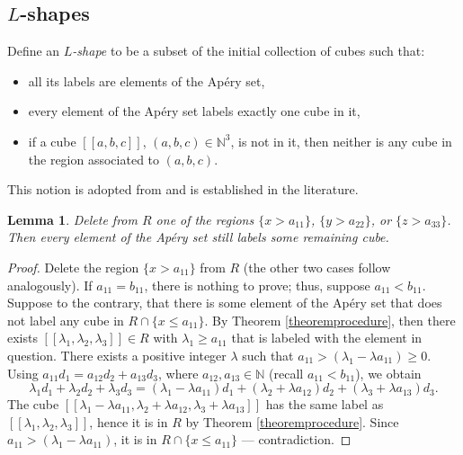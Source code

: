 \documentclass[12pt]{article}
\newtheorem{lemma}[thm]{Lemma}
\theoremstyle{remark}
\begin{document}
\subsection{$L$-shapes}\label{subsection_Lshapes}

Define an \emph{$L$-shape} to be a subset of the initial collection of cubes such that:
\begin{itemize}
    \item all its labels are elements of the Ap{\'e}ry set,
    \item every element of the Ap{\'e}ry set labels exactly one cube in it,
    \item if a cube $[[a,b,c]]$, $(a,b,c) \in \mathbb{N}^3$, is not in it, then neither is any cube in the region associated to $(a,b,c)$.
\end{itemize}
This notion is adopted from \cite{AGUILOGOST2015} and is established in the literature.

\begin{lemma}\label{lemma_procedure_2}
     Delete from $R$ one of the regions $\{x > a_{11}\}$, $\{y > a_{22}\}$, or $\{z > a_{33}\}$. Then every element of the Ap{\'e}ry set still labels some remaining cube.
\end{lemma}

\begin{proof}
Delete the region $\{x > a_{11}\}$ from $R$ (the other two cases follow analogously). 
If $a_{11} = b_{11}$, there is nothing to prove; thus, suppose $a_{11} < b_{11}$. Suppose to the contrary, that there is some element of the Ap{\'e}ry set that does not label any cube in $R \cap \{x \leq a_{11}\}$. By Theorem \ref{theoremprocedure}, then there exists $[[\lambda_1, \lambda_2,\lambda_3]] \in R$ with $\lambda_1 \geq a_{11}$ that is labeled with the element in question. There exists a positive integer $\lambda$ such that $a_{11} > (\lambda_1 - \lambda a_{11}) \geq 0$. Using $a_{11}d_1 = a_{12}d_2 + a_{13}d_3$, where $a_{12},a_{13} \in \mathbb{N}$ (recall $a_{11} < b_{11}$), we obtain
    \begin{equation}
        \lambda_1d_1 + \lambda_2d_2 + \lambda_3d_3 = (\lambda_1 - \lambda a_{11})d_1 + (\lambda_2+\lambda a_{12})d_2 + (\lambda_3+\lambda a_{13})d_3.
    \end{equation}
The cube $[[\lambda_1 - \lambda a_{11},\lambda_2+\lambda a_{12},\lambda_3+\lambda a_{13} ]]$ has the same label as $[[\lambda_1, \lambda_2,\lambda_3]]$, hence it is in $R$ by Theorem \ref{theoremprocedure}. Since $a_{11} >(\lambda_1 - \lambda a_{11})$, it is in $R \cap \{x \leq a_{11}\}$ --- contradiction.
\end{proof}
\end{document}
